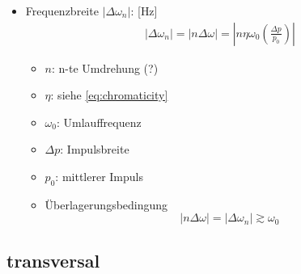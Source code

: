 \documentclass[12pt]{article}%
\newcommand{\itemf}{\item[$\circ$]}
\begin{document}
\begin{itemize}
\item Frequenzbreite $|\Delta \omega_n|$: [$\text{Hz}$]
\begin{align}
	|\Delta \omega_n| = | n \Delta \omega| = \left| n \eta \omega_0 \left(\frac{\Delta p}{p_0}\right) \right|
\end{align}
\begin{itemize}
	\item $n$: n-te Umdrehung (?)
	\item $\eta$: siehe \eqref{eq:chromaticity}
	\item $\omega_0$: Umlauffrequenz
	\item $\Delta p$: Impulsbreite
	\item $p_0$: mittlerer Impuls
\end{itemize}
\begin{itemize}
\itemf Überlagerungsbedingung \[ |n\Delta \omega| = | \Delta \omega_n| \gtrsim \omega_0 \]
\end{itemize}

\end{itemize}

\subsection{transversal}
\end{document}
